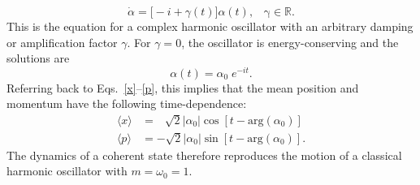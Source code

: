\documentclass[pra,12pt]{revtex4}
\begin{document}
\begin{equation}
  \dot{\alpha} = \big[-i + \gamma(t)\big] \alpha(t), \;\;\; \mathrm{\gamma}\in\mathbb{R}.
\end{equation}
This is the equation for a complex harmonic oscillator with an
arbitrary damping or amplification factor $\gamma$.  For $\gamma = 0$,
the oscillator is energy-conserving and the solutions are
\begin{equation}
  \alpha(t) = \alpha_0 \; e^{-it}.
\end{equation}
Referring back to Eqs.~\eqref{x}--\eqref{p}, this implies that the
mean position and momentum have the following time-dependence:
\begin{align}
  \langle x\rangle &=\, \;\;\sqrt{2} |\alpha_0| \cos\left[t - \mathrm{arg}(\alpha_0)\right] \\
  \langle p\rangle &= -\sqrt{2} |\alpha_0| \sin\left[t - \mathrm{arg}(\alpha_0)\right].
\end{align}
The dynamics of a coherent state therefore reproduces the motion of a
classical harmonic oscillator with $m = \omega_0 = 1$.
\end{document}
